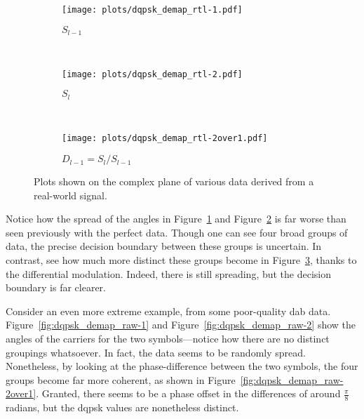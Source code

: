 \documentclass[class=report,11pt,crop=false]{standalone}
\begin{document}
\begin{figure}[htbp]
  \centering
  \captionsetup{type=figure}
  \begin{subfigure}[t]{0.3\textwidth}
    \centering
    \captionsetup{type=figure}
    \texttt{[image: plots/dqpsk\_demap\_rtl-1.pdf]}
    \caption{\(S_{l-1}\)}
    \label{fig:dqpsk_demap_rtl-1}
  \end{subfigure}%
  ~ 
  \begin{subfigure}[t]{0.3\textwidth}
    \centering
    \captionsetup{type=figure}
    \texttt{[image: plots/dqpsk\_demap\_rtl-2.pdf]}
    \caption{\(S_{l}\)}
    \label{fig:dqpsk_demap_rtl-2}
  \end{subfigure}
  ~ 
  \begin{subfigure}[t]{0.3\textwidth}
    \centering
    \captionsetup{type=figure}
    \texttt{[image: plots/dqpsk\_demap\_rtl-2over1.pdf]}
    \caption{\(D_{l-1} = S_{l}/S_{l-1}\)}
    \label{fig:dqpsk_demap_rtl-2over1}
  \end{subfigure}
  \caption{Plots shown on the complex plane of various data derived from a real-world  signal.}
  \label{fig:dqpsk_demap_rtl}
\end{figure}

Notice how the spread of the angles in Figure~\ref{fig:dqpsk_demap_rtl-1} and Figure~\ref{fig:dqpsk_demap_rtl-2} is far worse than seen previously with the perfect data. Though one can see four broad groups of data, the precise decision boundary between these groups is uncertain. In contrast, see how much more distinct these groups become in Figure~\ref{fig:dqpsk_demap_rtl-2over1}, thanks to the differential modulation. Indeed, there is still spreading, but the decision boundary is far clearer.

Consider an even more extreme example, from some poor-quality \gls{dab} data. Figure~\ref{fig:dqpsk_demap_raw-1} and Figure~\ref{fig:dqpsk_demap_raw-2} show the angles of the carriers for the two symbols---notice how there are no distinct groupings whatsoever. In fact, the data seems to be randomly spread. Nonetheless, by looking at the phase-difference between the two symbols, the four groups become far more coherent, as shown in Figure~\ref{fig:dqpsk_demap_raw-2over1}. Granted, there seems to be a phase offset in the differences of around \(\frac{\pi}{8}\) radians, but the \gls{dqpsk} values are nonetheless distinct.
\end{document}
